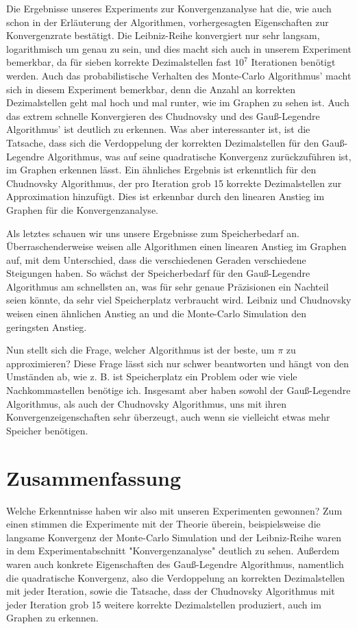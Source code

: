 \documentclass{scrartcl}
\theoremstyle{definition}
\newtheorem{approximation sequence}{Annäherungsfolge}
\begin{document}
Die Ergebnisse unseres Experiments zur Konvergenzanalyse hat die, wie auch schon in der Erläuterung der Algorithmen, vorhergesagten Eigenschaften zur Konvergenzrate bestätigt.
Die Leibniz-Reihe konvergiert nur sehr langsam, logarithmisch um genau zu sein, und dies macht sich auch in unserem Experiment bemerkbar, da für sieben korrekte Dezimalstellen fast 
\(10^7\) Iterationen benötigt werden. Auch das probabilistische Verhalten des Monte-Carlo Algorithmus' macht sich in diesem Experiment bemerkbar, denn die Anzahl an korrekten Dezimalstellen
geht mal hoch und mal runter, wie im Graphen zu sehen ist.
Auch das extrem schnelle Konvergieren des Chudnovsky und des Gauß-Legendre Algorithmus' ist deutlich zu erkennen. Was aber interessanter ist, ist die Tatsache, dass sich die Verdoppelung der korrekten 
Dezimalstellen für den Gauß-Legendre Algorithmus, was auf seine quadratische Konvergenz zurückzuführen ist, im Graphen erkennen lässt.
Ein ähnliches Ergebnis ist erkenntlich für den Chudnovsky Algorithmus, der pro Iteration grob 15 korrekte Dezimalstellen zur Approximation hinzufügt. Dies ist erkennbar durch den linearen Anstieg im 
Graphen für die Konvergenzanalyse. 

Als letztes schauen wir uns unsere Ergebnisse zum Speicherbedarf an. Überraschenderweise weisen alle Algorithmen einen linearen Anstieg im Graphen auf, mit dem Unterschied, dass die verschiedenen Geraden verschiedene Steigungen haben.
So wächst der Speicherbedarf für den Gauß-Legendre Algorithmus am schnellsten an, was für sehr genaue Präzisionen ein Nachteil seien könnte, da sehr viel Speicherplatz verbraucht wird.
Leibniz und Chudnovsky weisen einen ähnlichen Anstieg an und die Monte-Carlo Simulation den geringsten Anstieg.

Nun stellt sich die Frage, welcher Algorithmus ist der beste, um \(\pi\) zu approximieren? 
Diese Frage lässt sich nur schwer beantworten und hängt von den Umständen ab, wie z. B. ist Speicherplatz ein Problem oder wie viele Nachkommastellen benötige ich.
Insgesamt aber haben sowohl der Gauß-Legendre Algorithmus, als auch der Chudnovsky Algorithmus, uns mit ihren Konvergenzeigenschaften sehr überzeugt, auch wenn sie vielleicht etwas mehr Speicher benötigen.

\section{Zusammenfassung}
Welche Erkenntnisse haben wir also mit unseren Experimenten gewonnen? Zum einen stimmen die Experimente mit der Theorie überein, beispielsweise die 
langsame Konvergenz der Monte-Carlo Simulation und der Leibniz-Reihe waren in dem Experimentabschnitt "Konvergenzanalyse" deutlich zu sehen. 
Außerdem waren auch konkrete Eigenschaften des Gauß-Legendre Algorithmus, namentlich die quadratische Konvergenz, also die Verdoppelung an korrekten Dezimalstellen 
mit jeder Iteration, sowie die Tatsache, dass der Chudnovsky Algorithmus mit jeder Iteration grob 15 weitere korrekte Dezimalstellen produziert, auch im Graphen zu erkennen.
\end{document}
